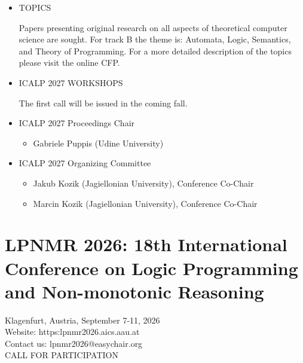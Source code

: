 \documentclass[prodmode,acmtecs]{acmsmall} %
\begin{document}
\begin{itemize}
  LIPIcs volumes are published according to the principle of Open Access, i.e., they are available online and free of charge. The accepted papers will need to comply with the LIPIcs style. 
 
\item  TOPICS  
 
  Papers presenting original research on all aspects of theoretical computer science are sought. For track B the theme is: Automata, Logic, Semantics, and Theory of Programming. For a more detailed description of the topics please visit the online CFP. 
 
\item  ICALP 2027 WORKSHOPS 
 
  The first call will be issued in the coming fall. 
 
\item  ICALP 2027 Proceedings Chair 
 
\begin{itemize}\item  Gabriele Puppis (Udine University)
\end{itemize} 
\item  ICALP 2027 Organizing Committee 
 
\begin{itemize}\item  Jakub Kozik (Jagiellonian University), Conference Co-Chair
\item  Marcin Kozik (Jagiellonian University), Conference Co-Chair
\end{itemize} 
\end{itemize}\section{LPNMR 2026: 18th International Conference on Logic Programming and Non-monotonic Reasoning}\label{LPNMR2026}  Klagenfurt, Austria, September 7-11, 2026\\ 
  Website: https:lpnmr2026.aics.aau.at\\ 
  Contact us: lpnmr2026@easychair.org\\ 
CALL FOR PARTICIPATION 
\end{document}
